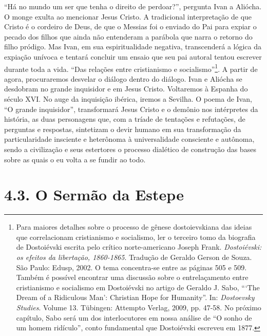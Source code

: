 ``Há no mundo um ser que tenha o direito de perdoar?'', pergunta Ivan a
Aliócha. O monge exulta ao mencionar Jesus Cristo. A tradicional
interpretação de que Cristo é o cordeiro de Deus, de que o Messias foi o
enviado do Pai para expiar o pecado dos filhos que ainda não entenderam
a parábola que narra o retorno do filho pródigo. Mas Ivan, em sua
espiritualidade negativa, transcenderá a lógica da expiação unívoca e
tentará concluir um ensaio que seu pai autoral tentou escrever durante
toda a vida. ``Das relações entre cristianismo e socialismo''\footnote{Para
  maiores detalhes sobre o processo de gênese dostoievskiana das ideias
  que correlacionam cristianismo e socialismo, ler o terceiro tomo da
  biografia de Dostoiévski escrita pelo crítico norte-americano Joseph
  Frank. \emph{Dostoiévski: os efeitos da libertação, 1860-1865}.
  Tradução de Geraldo Gerson de Souza. São Paulo: Edusp, 2002. O tema
  concentra-se entre as páginas 505 e 509. Também é possível encontrar
  uma discussão sobre o entrelaçamento entre cristianismo e socialismo
  em Dostoiévski no artigo de Geraldo J. Sabo, ```The Dream of a
  Ridiculous Man': Christian Hope for Humanity''. In: \emph{Dostoevsky
  Studies}. Volume 13. Tübingen: Attempto Verlag, 2009, pp. 47-58. No
  próximo capítulo, Sabo será um dos interlocutores em nossa análise de
  ``O sonho de um homem ridículo'', conto fundamental que Dostoiévski
  escreveu em 1877.}. A partir de agora, procuraremos desvelar o diálogo
dentro do diálogo. Ivan e Aliócha se desdobram no grande inquisidor e em
Jesus Cristo. Voltaremos à Espanha do século XVI. No auge da inquisição
ibérica, iremos a Sevilha. O poema de Ivan, ``O grande inquisidor'',
transformará Jesus Cristo e o demônio nos intérpretes da história, as
duas personagens que, com a tríade de tentações e refutações, de
perguntas e respostas, sintetizam o devir humano em sua transformação da
particularidade insciente e heterônoma à universalidade consciente e
autônoma, sendo a civilização e seus estertores o processo dialético de
construção das bases sobre as quais o eu volta a se fundir ao todo.

\section{4.3. O Sermão da Estepe}

